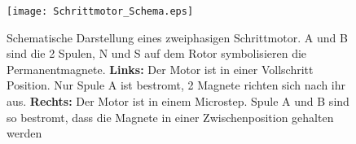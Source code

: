 

\begin{figure}[h]
	\centering
	\texttt{[image: Schrittmotor\_Schema.eps]}
	\caption{Schematische Darstellung eines zweiphasigen Schrittmotor. A und B sind die 2 Spulen, N und S auf dem Rotor symbolisieren die Permanentmagnete. \textbf{Links:} Der Motor ist in einer Vollschritt Position. Nur Spule A ist bestromt, 2 Magnete richten sich nach ihr aus. \textbf{Rechts:} Der Motor ist in einem Microstep. Spule A und B sind so bestromt, dass die Magnete in einer Zwischenposition gehalten werden }
	\label{pic:Schrittmotor_Schema}
\end{figure}